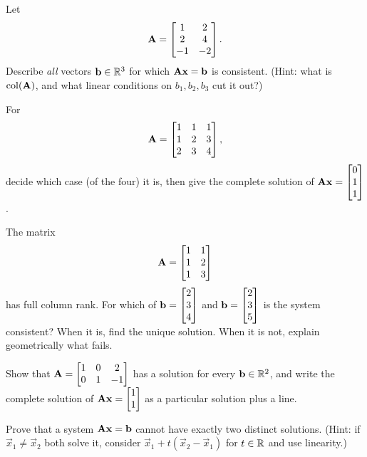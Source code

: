 \begin{exercise}
\label{ch13:ex-bvary}
Let
\[
  \mathbf{A}=\begin{bmatrix}1&2\\2&4\\-1&-2\end{bmatrix}.
\]
Describe \emph{all} vectors
$\mathbf{b}\in\mathbb{R}^3$ for which $\mathbf{A}\mathbf{x}=\mathbf{b}$ is consistent. (Hint: what is
$\operatorname{col}(\mathbf{A})$, and what linear conditions on $b_1,b_2,b_3$ cut it out?)
\end{exercise}

\begin{exercise}
\label{ch13:ex-sq}
For
\[
  \mathbf{A}=\begin{bmatrix}1&1&1\\1&2&3\\2&3&4\end{bmatrix},
\]
decide which case
(of the four) it is, then give the complete solution of $\mathbf{A}\mathbf{x}=\begin{bmatrix}0\\1\\1\end{bmatrix}$.
\end{exercise}

\begin{exercise}
\label{ch13:ex-fcr}
The matrix
\[
  \mathbf{A}=\begin{bmatrix}1&1\\1&2\\1&3\end{bmatrix}
\]
has full column rank. For
which of $\mathbf{b}=\begin{bmatrix}2\\3\\4\end{bmatrix}$ and $\mathbf{b}=\begin{bmatrix}2\\3\\5\end{bmatrix}$ is the system
consistent? When it is, find the unique solution. When it is not, explain geometrically
what fails.
\end{exercise}

\begin{exercise}
\label{ch13:ex-frr}
Show that $\mathbf{A}=\begin{bmatrix}1&0&2\\0&1&-1\end{bmatrix}$ has a solution for every
$\mathbf{b}\in\mathbb{R}^2$, and write the complete solution of $\mathbf{A}\mathbf{x}=\begin{bmatrix}1\\1\end{bmatrix}$ as a
particular solution plus a line.
\end{exercise}

\begin{exercise}
\label{ch13:ex-trichotomy}
Prove that a system $\mathbf{A}\mathbf{x}=\mathbf{b}$ cannot have exactly two distinct solutions.
(Hint: if $\vec{x}_1\neq\vec{x}_2$ both solve it, consider
$\vec{x}_1+t(\vec{x}_2-\vec{x}_1)$ for $t\in\mathbb{R}$ and use linearity.)
\end{exercise}

